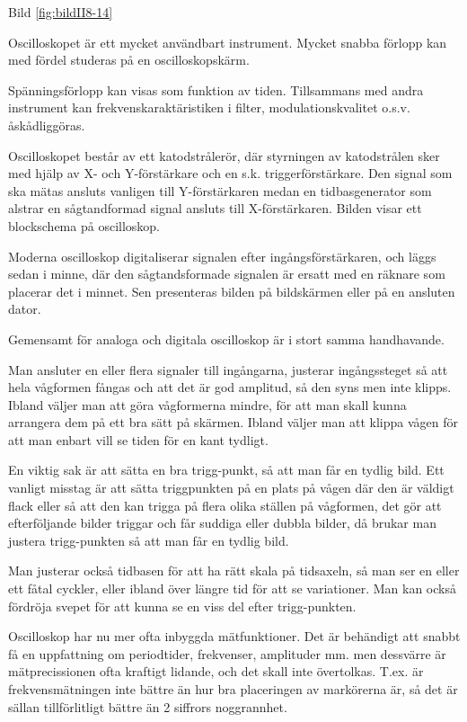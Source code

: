 Bild \ref{fig:bildII8-14}

Oscilloskopet är ett mycket användbart instrument. Mycket snabba
förlopp kan med fördel studeras på en oscilloskopskärm.

Spänningsförlopp kan visas som funktion av tiden. Tillsammans med
andra instrument kan frekvenskaraktäristiken i filter,
modulationskvalitet o.s.v. åskådliggöras.

Oscilloskopet består av ett katodstrålerör, där styrningen av
katodstrålen sker med hjälp av X- och Y-förstärkare och en s.k.
triggerförstärkare. Den signal som ska mätas ansluts vanligen till
Y-förstärkaren medan en tidbasgenerator som alstrar en sågtandformad
signal ansluts till X-förstärkaren.  Bilden visar ett blockschema på
oscilloskop.

Moderna oscilloskop digitaliserar signalen efter ingångsförstärkaren,
och läggs sedan i minne, där den sågtandsformade signalen är ersatt med en
räknare som placerar det i minnet. Sen presenteras bilden på bildskärmen
eller på en ansluten dator.

Gemensamt för analoga och digitala oscilloskop är i stort samma handhavande.

Man ansluter en eller flera signaler till ingångarna, justerar ingångssteget
så att hela vågformen fångas och att det är god amplitud, så den syns men inte
klipps.
Ibland väljer man att göra vågformerna mindre, för att man skall kunna
arrangera dem på ett bra sätt på skärmen.
Ibland väljer man att klippa vågen för att man enbart vill se tiden för en
kant tydligt.

En viktig sak är att sätta en bra trigg-punkt, så att man får en tydlig bild.
Ett vanligt misstag är att sätta triggpunkten på en plats på vågen där den är
väldigt flack eller så att den kan trigga på flera olika ställen på vågformen,
det gör att efterföljande bilder triggar och får suddiga eller dubbla bilder,
då brukar man justera trigg-punkten så att man får en tydlig bild.

Man justerar också tidbasen för att ha rätt skala på tidsaxeln, så man ser en
eller ett fåtal cyckler, eller ibland över längre tid för att se variationer.
Man kan också fördröja svepet för att kunna se en viss del efter trigg-punkten.

Oscilloskop har nu mer ofta inbyggda mätfunktioner.
Det är behändigt att snabbt få en uppfattning om periodtider, frekvenser,
amplituder mm. men dessvärre är mätprecissionen ofta kraftigt lidande, och
det skall inte övertolkas.
T.ex. är frekvensmätningen inte bättre än hur bra placeringen av markörerna är,
så det är sällan tillförlitligt bättre än 2 siffrors noggrannhet.

